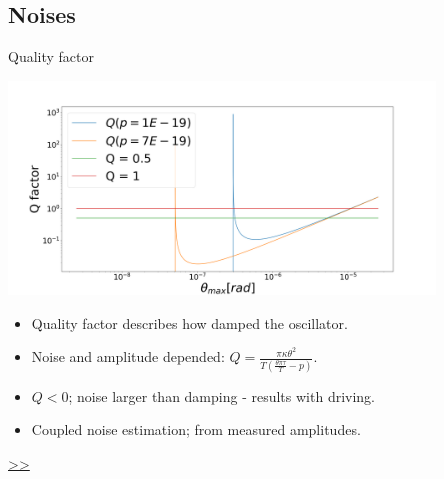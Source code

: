 \documentclass{beamer}
\begin{document}
\subsection{Noises}

\begin{frame}{\hypertarget{frame:Quality factor}{Quality factor}}
	\begin{center}		
		\includegraphics[width=0.85\textwidth,keepaspectratio]{Q factor.png}
	\end{center}
	\begin{itemize}	
		\item Quality factor describes how damped the oscillator.
		\item Noise and amplitude depended: $Q =  \frac{\pi\kappa\theta^2}{T(\frac{\theta\pi\tau}{T} -p)} $.
		\item $Q<0$; noise larger than damping - results with driving.
		\item Coupled noise estimation; from measured amplitudes. 
	\end{itemize}
	\hyperlink{frame:Quality factor 1}{>>} 
\end{frame}
\end{document}
